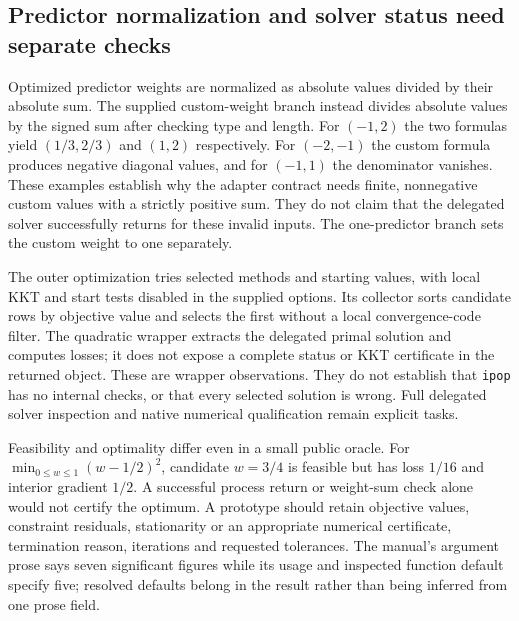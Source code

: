 \subsection{Predictor normalization and solver status need separate checks}
Optimized predictor weights are normalized as absolute values divided by
their absolute sum. The supplied custom-weight branch instead divides
absolute values by the signed sum after checking type and length.
For $(-1,2)$ the two formulas yield $(1/3,2/3)$ and $(1,2)$ respectively.
For $(-2,-1)$ the custom formula produces negative diagonal values, and
for $(-1,1)$ the denominator vanishes. These examples establish why
the adapter contract needs finite, nonnegative custom values with a
strictly positive sum. They do not claim that the delegated solver
successfully returns for these invalid inputs. The one-predictor branch
sets the custom weight to one separately.
\citep{exec24_synth_source,exec24_synth_choice}

The outer optimization tries selected methods and starting values,
with local KKT and start tests disabled in the supplied options. Its
collector sorts candidate rows by objective value and selects the first
without a local convergence-code filter. The quadratic wrapper extracts
the delegated primal solution and computes losses; it does not expose a
complete status or KKT certificate in the returned object. These are
wrapper observations. They do not establish that \texttt{ipop} has no
internal checks, or that every selected solution is wrong. Full delegated
solver inspection and native numerical qualification remain explicit tasks.
\citep{exec24_synth_source}

Feasibility and optimality differ even in a small public oracle. For
$\min_{0\leq w\leq1}(w-1/2)^2$, candidate $w=3/4$ is feasible but has
loss $1/16$ and interior gradient $1/2$. A successful process return or
weight-sum check alone would not certify the optimum. A prototype should
retain objective values, constraint residuals, stationarity or an appropriate
numerical certificate, termination reason, iterations and requested
tolerances. The manual's argument prose says seven significant figures
while its usage and inspected function default specify five; resolved
defaults belong in the result rather than being inferred from one prose field.
\citep{exec24_synth_source,exec24_synth_choice}

